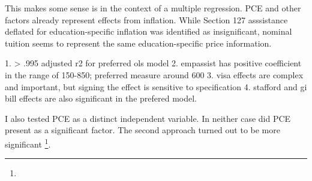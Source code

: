 \documentclass[review]{elsarticle}
\begin{document}
    This makes some sense is in the context of a multiple regression.
    PCE and other factors already represent effects from inflation.
    While Section 127 asssistance deflated for education-specific inflation was identified as insignificant,
    nominal tuition seems to represent the same education-specific price information.

    1. > .995 adjusted r2 for preferred ols model
    2. empassist has positive coefficient in the range of 150-850; preferred measure around 600
    3. visa effects are complex and important, but signing the effect is sensitive to specification
    4. stafford and gi bill effects are also significant in the prefered model.

    I also tested PCE as a distinct independent variable.
    In neither case did PCE present as a significant factor.
    The second approach turned out to be more significant
    \footnote{
    }.


    
    
    
    
\end{document}

